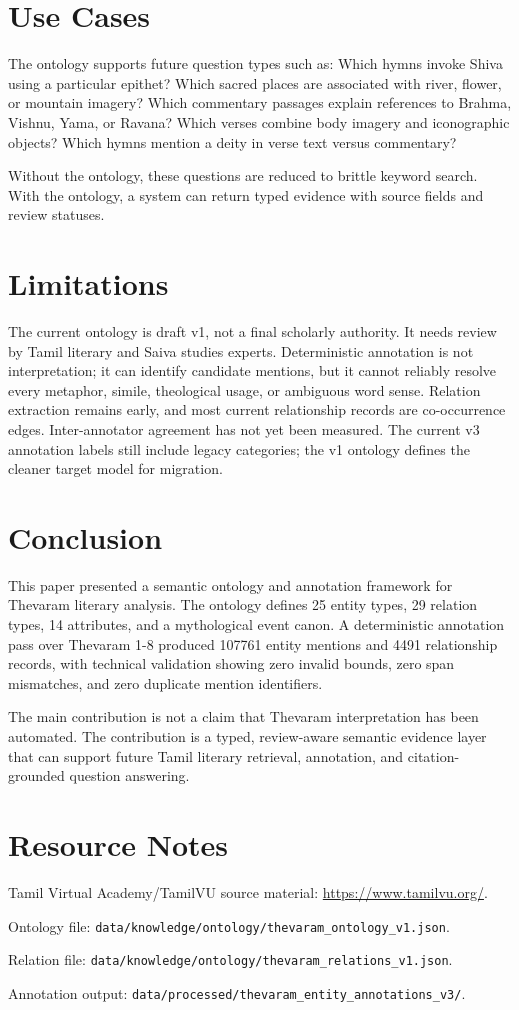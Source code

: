 \documentclass[11pt]{article}
\begin{document}
\section{Use Cases}
The ontology supports future question types such as: Which hymns invoke Shiva using a particular epithet? Which sacred places are associated with river, flower, or mountain imagery? Which commentary passages explain references to Brahma, Vishnu, Yama, or Ravana? Which verses combine body imagery and iconographic objects? Which hymns mention a deity in verse text versus commentary?

Without the ontology, these questions are reduced to brittle keyword search. With the ontology, a system can return typed evidence with source fields and review statuses.

\section{Limitations}
The current ontology is draft v1, not a final scholarly authority. It needs review by Tamil literary and Saiva studies experts. Deterministic annotation is not interpretation; it can identify candidate mentions, but it cannot reliably resolve every metaphor, simile, theological usage, or ambiguous word sense. Relation extraction remains early, and most current relationship records are co-occurrence edges. Inter-annotator agreement has not yet been measured. The current v3 annotation labels still include legacy categories; the v1 ontology defines the cleaner target model for migration.

\section{Conclusion}
This paper presented a semantic ontology and annotation framework for Thevaram literary analysis. The ontology defines 25 entity types, 29 relation types, 14 attributes, and a mythological event canon. A deterministic annotation pass over Thevaram 1-8 produced 107761 entity mentions and 4491 relationship records, with technical validation showing zero invalid bounds, zero span mismatches, and zero duplicate mention identifiers.

The main contribution is not a claim that Thevaram interpretation has been automated. The contribution is a typed, review-aware semantic evidence layer that can support future Tamil literary retrieval, annotation, and citation-grounded question answering.

\section*{Resource Notes}
Tamil Virtual Academy/TamilVU source material: \url{https://www.tamilvu.org/}.

Ontology file: \texttt{data/knowledge/ontology/thevaram\_ontology\_v1.json}.

Relation file: \texttt{data/knowledge/ontology/thevaram\_relations\_v1.json}.

Annotation output: \texttt{data/processed/thevaram\_entity\_annotations\_v3/}.
\end{document}
